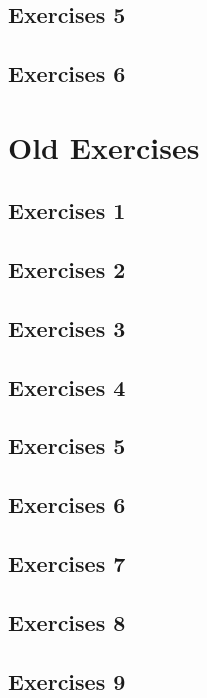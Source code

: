 \subsection{Exercises 5}

\subsection{Exercises 6}



\section{Old Exercises}
\subsection{Exercises 1}

\subsection{Exercises 2}

\subsection{Exercises 3}

\subsection{Exercises 4}

\subsection{Exercises 5}

\subsection{Exercises 6}

\subsection{Exercises 7}

\subsection{Exercises 8}

\subsection{Exercises 9}



